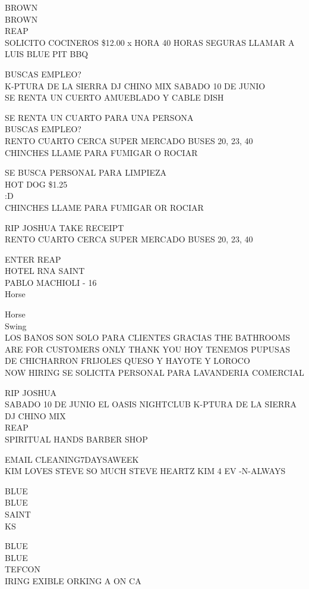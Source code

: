 \documentclass[10pt,letterpaper]{article}
\begin{document}
BROWN\\
BROWN\\
REAP\\
SOLICITO COCINEROS \$12.00 x HORA 40 HORAS SEGURAS LLAMAR A LUIS BLUE PIT BBQ

BUSCAS EMPLEO?\\
K{-}PTURA DE LA SIERRA DJ CHINO MIX SABADO 10 DE JUNIO\\
SE RENTA UN CUERTO AMUEBLADO Y CABLE DISH

SE RENTA UN CUARTO PARA UNA PERSONA\\
BUSCAS EMPLEO?\\
RENTO CUARTO CERCA SUPER MERCADO BUSES 20, 23, 40\\
CHINCHES LLAME PARA FUMIGAR O ROCIAR

SE BUSCA PERSONAL PARA LIMPIEZA\\
HOT DOG \$1.25\\
:D\\
CHINCHES LLAME PARA FUMIGAR OR ROCIAR

RIP JOSHUA TAKE RECEIPT\\
RENTO CUARTO CERCA SUPER MERCADO BUSES 20, 23, 40

ENTER REAP\\
HOTEL RNA SAINT\\
PABLO MACHIOLI {-} 16\\
Horse

Horse\\
Swing\\
LOS BANOS SON SOLO PARA CLIENTES GRACIAS THE BATHROOMS ARE FOR CUSTOMERS ONLY THANK YOU HOY TENEMOS PUPUSAS DE CHICHARRON FRIJOLES QUESO Y HAYOTE Y LOROCO\\
NOW HIRING SE SOLICITA PERSONAL PARA LAVANDERIA COMERCIAL

RIP JOSHUA\\
SABADO 10 DE JUNIO EL OASIS NIGHTCLUB K{-}PTURA DE LA SIERRA DJ CHINO MIX\\
REAP\\
SPIRITUAL HANDS BARBER SHOP

EMAIL CLEANING7DAYSAWEEK\\
KIM LOVES STEVE SO MUCH STEVE HEARTZ KIM 4 EV {-}N{-}ALWAYS

BLUE\\
BLUE\\
SAINT\\
KS

BLUE\\
BLUE\\
TEFCON\\
IRING EXIBLE ORKING A ON CA
\end{document}
